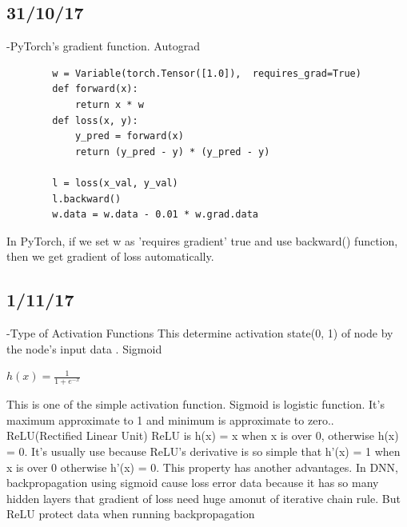 \documentclass{article}
\begin{document}
\begin{CJK}{UTF8}{}
\subsection{31/10/17}
-PyTorch's gradient function. Autograd
 \begin{verbatim}
        w = Variable(torch.Tensor([1.0]),  requires_grad=True)
        def forward(x):
            return x * w
        def loss(x, y):
            y_pred = forward(x)
            return (y_pred - y) * (y_pred - y)

        l = loss(x_val, y_val)
        l.backward()
        w.data = w.data - 0.01 * w.grad.data
\end{verbatim}\newline
In PyTorch, if we set w as 'requires gradient' true and use backward() function, then we get gradient of loss automatically.\newline

\subsection{1/11/17}
-Type of Activation Functions\newline
This determine activation state(0, 1) of node by the node's input data . Sigmoid\newline
\begin{center}$h(x) = \frac{1}{1+{e}^{-x}}$\end{center}\newline
This is one of the simple activation function. Sigmoid is logistic function. It's maximum approximate to 1 and minimum is approximate to zero.. ReLU(Rectified Linear Unit)\newline
ReLU is h(x) = x when x is over 0, otherwise h(x) = 0. It's usually use because ReLU's derivative is so simple that h'(x) =  1 when x is over 0 otherwise h'(x) = 0.\newline
This property has another advantages. In DNN, backpropagation using sigmoid cause loss error data because it has so many hidden layers that gradient of loss need huge amonut of iterative chain rule. But ReLU protect data when running backpropagation\newline


\end{CJK}
\end{document}
